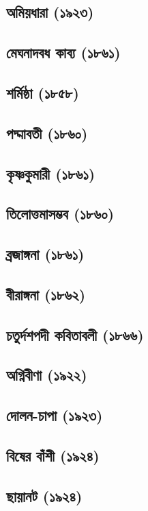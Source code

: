 \documentclass[11pt]{article}
\begin{document}
\subsection{অমিয়ধারা (১৯২৩)}
\label{sec:orgc3d9b85}
\subsection{মেঘনাদবধ কাব্য (১৮৬১)}
\label{sec:orga473d12}
\subsection{শর্মিষ্ঠা (১৮৫৮)}
\label{sec:orge8c28a6}
\subsection{পদ্মাবতী (১৮৬০)}
\label{sec:org374b636}
\subsection{কৃষ্ণকুমারী (১৮৬১)}
\label{sec:org08fa516}
\subsection{তিলোত্তমাসম্ভব (১৮৬০)}
\label{sec:orga70a880}
\subsection{ব্রজাঙ্গনা (১৮৬১)}
\label{sec:org681e7a7}
\subsection{বীরাঙ্গনা (১৮৬২)}
\label{sec:orgfc1043e}
\subsection{চতুর্দশপদী কবিতাবলী (১৮৬৬)}
\label{sec:orgd9fc787}
\subsection{অগ্নিবীণা (১৯২২)}
\label{sec:orgb4c3132}
\subsection{দোলন-চাপা (১৯২৩)}
\label{sec:orge16a95a}
\subsection{বিষের বাঁশী (১৯২৪)}
\label{sec:org911c75d}
\subsection{ছায়ানট (১৯২৪)}
\label{sec:org05d9f10}
\end{document}
